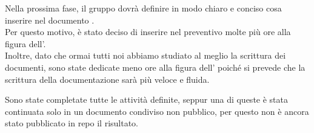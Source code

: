 Nella prossima fase, il gruppo dovrà definire in modo chiaro e conciso cosa inserire nel documento .\\
Per questo motivo, è stato deciso di inserire nel preventivo molte più ore alla figura dell'.\\
Inoltre, dato che ormai tutti noi abbiamo studiato al meglio la scrittura dei documenti, sono state dedicate meno ore alla figura dell' poiché si prevede che la scrittura della documentazione sarà più veloce e fluida.

Sono state completate tutte le attività definite, seppur una di queste è stata continuata solo in un documento condiviso non pubblico, per questo non è ancora stato pubblicato in repo il risultato.